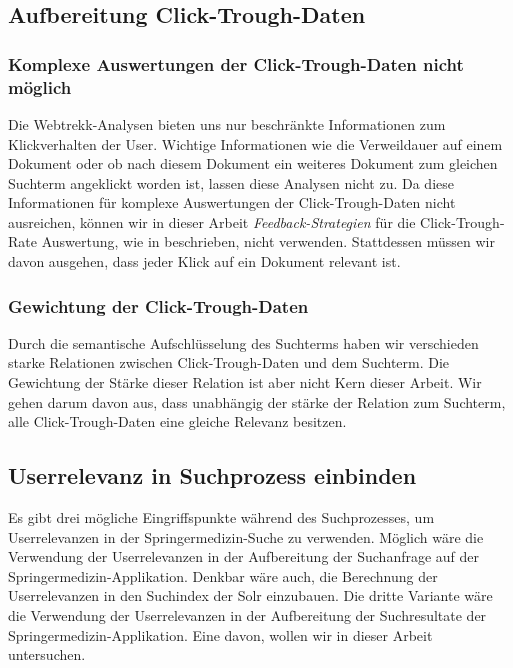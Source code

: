 \subsection{Aufbereitung Click-Trough-Daten}
\label{sec:Reranking:Methodik:Click-Trough-Daten}

\subsubsection{Komplexe Auswertungen der Click-Trough-Daten nicht möglich}
\label{sec:Reranking:Methodik:Click-Trough-Daten:Click-Trough-DatenAuswertungen}

Die Webtrekk-Analysen bieten uns nur beschränkte Informationen zum Klickverhalten der User. Wichtige Informationen wie die Verweildauer auf einem Dokument oder ob nach diesem Dokument ein weiteres Dokument zum gleichen Suchterm angeklickt worden ist, lassen diese Analysen nicht zu. Da diese Informationen für komplexe Auswertungen der Click-Trough-Daten nicht ausreichen, können wir in dieser Arbeit \textit{Feedback-Strategien} für die Click-Trough-Rate Auswertung, wie in \cite{Joachims} beschrieben, nicht verwenden. Stattdessen müssen wir davon ausgehen, dass jeder Klick auf ein Dokument relevant ist.

\subsubsection{Gewichtung der Click-Trough-Daten}
\label{sec:Reranking:Methodik:Click-Trough-Daten:Gewichtung}

Durch die semantische Aufschlüsselung des Suchterms haben wir verschieden starke Relationen zwischen Click-Trough-Daten und dem Suchterm. Die Gewichtung der Stärke dieser Relation ist aber nicht Kern dieser Arbeit. Wir gehen darum davon aus, dass unabhängig der stärke der Relation zum Suchterm, alle Click-Trough-Daten eine gleiche Relevanz besitzen.

\subsection{Userrelevanz in Suchprozess einbinden}
\label{sec:Reranking:Methodik:SucheEinbinden}

Es gibt drei mögliche Eingriffspunkte während des Suchprozesses, um Userrelevanzen in der Springermedizin-Suche zu verwenden. Möglich wäre die Verwendung der Userrelevanzen in der Aufbereitung der Suchanfrage auf der Springermedizin-Applikation. Denkbar wäre auch, die Berechnung der Userrelevanzen in den Suchindex der Solr einzubauen. Die dritte Variante wäre die Verwendung der Userrelevanzen in der Aufbereitung der Suchresultate der Springermedizin-Applikation. Eine davon, wollen wir in dieser Arbeit untersuchen. 


